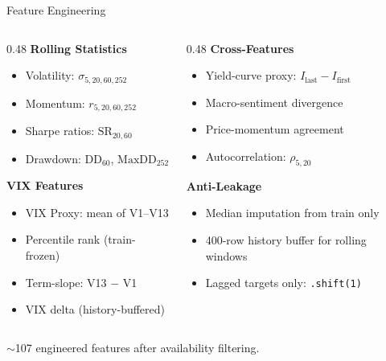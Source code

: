 \documentclass[aspectratio=169]{beamer}
\begin{document}
\begin{frame}{Feature Engineering}
\small
\begin{columns}[T]
\begin{column}{0.48\textwidth}
\textbf{Rolling Statistics}
\begin{itemize}
    \item Volatility: $\sigma_{5,20,60,252}$
    \item Momentum: $r_{5,20,60,252}$
    \item Sharpe ratios: $\text{SR}_{20,60}$
    \item Drawdown: $\text{DD}_{60}$, $\text{MaxDD}_{252}$
\end{itemize}
\vspace{0.2cm}
\textbf{VIX Features}
\begin{itemize}
    \item VIX Proxy: mean of V1--V13
    \item Percentile rank (train-frozen)
    \item Term-slope: V13 $-$ V1
    \item VIX delta (history-buffered)
\end{itemize}
\end{column}
\begin{column}{0.48\textwidth}
\textbf{Cross-Features}
\begin{itemize}
    \item Yield-curve proxy: $I_{\text{last}} - I_{\text{first}}$
    \item Macro-sentiment divergence
    \item Price-momentum agreement
    \item Autocorrelation: $\rho_{5,20}$
\end{itemize}
\vspace{0.2cm}
\textbf{Anti-Leakage}
\begin{itemize}
    \item Median imputation from train only
    \item 400-row history buffer for rolling windows
    \item Lagged targets only: \texttt{.shift(1)}
\end{itemize}
\end{column}
\end{columns}
\vspace{0.3cm}
$\sim$107 engineered features after availability filtering.
\end{frame}
\end{document}
